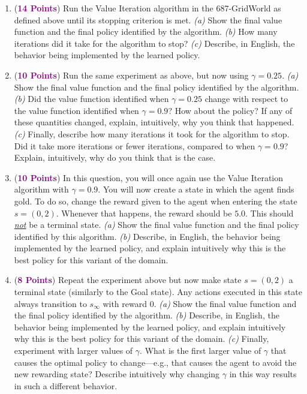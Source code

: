 \documentclass{article}
\newcommand{\POINTS}[1]{\textcolor{purple}{\textbf{{#1}}}}
\begin{document}
\begin{enumerate}
    \item (\POINTS{14 Points}) Run the Value Iteration algorithm in the 687-GridWorld as defined above until its stopping criterion is met. \textit{(a)} Show the final value function and the final policy identified by the algorithm. \textit{(b)} How many iterations did it take for the algorithm to stop? \textit{(c)} Describe, in English, the behavior being implemented by the learned  policy.
    
    
    \item (\POINTS{10 Points}) Run the same experiment as above, but now using $\gamma=0.25$. \textit{(a)} Show the final value function and the final policy identified by the algorithm. \textit{(b)} Did the value function identified when $\gamma=0.25$ change with respect to the value function identified when $\gamma=0.9$? How about the policy? If any of these quantities changed, explain, intuitively, why you think that happened. \textit{(c)} Finally, describe how many iterations it took for the algorithm to stop. Did it take more iterations or fewer iterations, compared to when $\gamma=0.9$? Explain, intuitively, why do you think that is the case.


    \item (\POINTS{10 Points}) In this question, you will once again use the Value Iteration algorithm with $\gamma=0.9$. You will now create a state in which the agent finds gold. To do so, change the reward given to the agent when entering the state $s=(0,2)$. Whenever that happens, the reward should be $5.0$. This should \textit{\ul{not}} be a terminal state. \textit{(a)} Show the final value function and the final policy identified by this algorithm. \textit{(b)} Describe, in English, the behavior being implemented by the learned policy, and explain intuitively why this is the best policy for this variant of the domain.
    
    
    \item (\POINTS{8 Points}) Repeat the experiment above but now make state $s=(0,2)$ a terminal state (similarly to the Goal state). Any actions executed in this state always transition to $s_\infty$ with reward $0$. \textit{(a)} Show the final value function and the final policy identified by the algorithm. \textit{(b)} Describe, in English, the behavior being implemented by the learned policy, and explain intuitively why this is the best policy for this variant of the domain. \textit{(c)} Finally, experiment with larger values of $\gamma$. What is the first larger value of $\gamma$ that causes the optimal policy to change---e.g., that causes the agent to avoid the new rewarding state? Describe intuitively why changing $\gamma$ in this way results in such a different behavior.
    

\end{enumerate}
\end{document}
